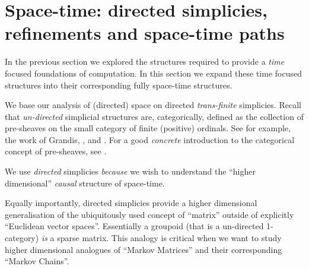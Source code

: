 
\chapter{Space-time: directed simplicies, refinements and space-time paths}

In the previous section we explored the structures required to provide a \emph{time} focused 
foundations of computation. In this section we expand these time focused structures into 
their corresponding fully space-time structures.

We base our analysis of (directed) space on directed \emph{trans-finite} simplicies.
Recall that \emph{un-directed} simplicial structures are, categorically, defined as the
collection of pre-sheaves on the small category of finite (positive) ordinals. See for
example, the work of Grandis, \cite{grandis2001symSimpSets}, and
\cite{grandis2001fundamentalFunctorsSimplicial}. For a good \emph{concrete} introduction
to the categorical concept of pre-sheaves, see \cite{reyesReyesZolfaghari2004presheaves}.

We use \emph{directed} simplicies \emph{because} we wish to understand the ``higher
dimensional'' \emph{causal} structure of space-time.

Equally importantly, directed simplicies provide a higher dimensional generalisation of
the ubiquitously used concept of ``matrix'' outside of explicitly ``Euclidean vector
spaces''. Essentially a groupoid (that is a un-directed 1-category) \emph{is} a sparse
matrix. This analogy is critical when we want to study higher dimensional analogues of
``Markov Matrices'' and their corresponding ``Markov Chains''.
